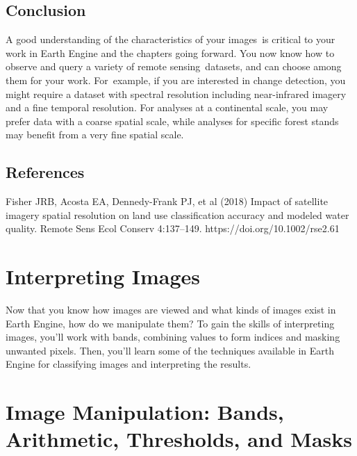 \documentclass[
  letterpaper,
  DIV=11,
  numbers=noendperiod]{scrreprt}
\begin{document}
\hypertarget{conclusion-3}{%
\section*{Conclusion}\label{conclusion-3}}


A good understanding of the characteristics of your images~is critical
to your work in Earth Engine and the chapters going forward. You now
know how to observe and query a variety of remote sensing~datasets, and
can choose among them for your work. For~example, if you are interested
in change detection, you might require a dataset with spectral
resolution including near-infrared imagery and a fine temporal
resolution. For analyses at a continental scale, you may prefer data
with a coarse spatial scale, while analyses for specific forest stands
may benefit from a very fine spatial scale.

\hypertarget{references-1}{%
\section*{References}\label{references-1}}


Fisher JRB, Acosta EA, Dennedy-Frank PJ, et al (2018) Impact of
satellite imagery spatial resolution on land use classification accuracy
and modeled water quality. Remote Sens Ecol Conserv 4:137--149.
https://doi.org/10.1002/rse2.61

\hypertarget{interpreting-images}{%
\chapter{Interpreting Images}\label{interpreting-images}}

Now that you know how images are viewed and what kinds of images exist
in Earth Engine, how do we manipulate them? To gain the skills of
interpreting images, you'll work with bands, combining values to form
indices and masking unwanted pixels. Then, you'll learn some of the
techniques available in Earth Engine for classifying images and
interpreting the results.

\hypertarget{image-manipulation-bands-arithmetic-thresholds-and-masks}{%
\chapter{Image Manipulation: Bands, Arithmetic, Thresholds, and
Masks}\label{image-manipulation-bands-arithmetic-thresholds-and-masks}}
\end{document}

